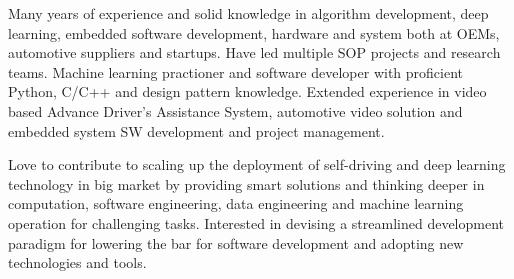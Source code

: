 \documentclass[../resume.tex]{subfiles}
\begin{document}


\begin{cvparagraph}

Many years of experience and solid knowledge in algorithm development, deep learning, embedded software development, hardware and system both at OEMs, automotive suppliers and startups. Have led multiple SOP projects and research teams. Machine learning practioner and software developer with proficient Python, C/C++ and design pattern knowledge. Extended experience in video based Advance Driver’s Assistance System, automotive video solution and embedded system SW development and project management.

Love to contribute to scaling up the deployment of self-driving and deep learning technology in big market by providing smart solutions and thinking deeper in computation, software engineering, data engineering and machine learning operation for challenging tasks. Interested in devising a streamlined development paradigm for lowering the bar for software development and adopting new technologies and tools.


\end{cvparagraph}
\end{document}
